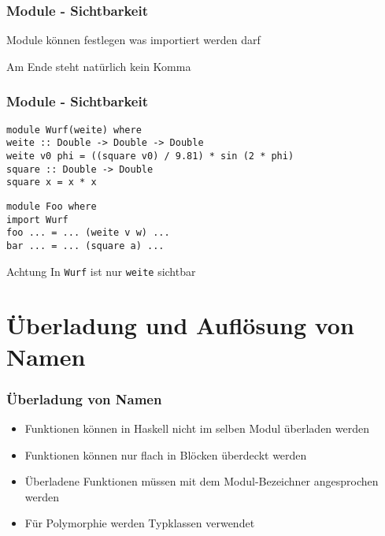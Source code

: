 \documentclass[fleqn,11pt,aspectratio=43]{beamer}
\begin{document}
\begin{frame}
\frametitle{Module - Sichtbarkeit}
\begin{block}{\vspace*{-3ex}}
Module können festlegen was importiert werden darf
\end{block}
\begin{block}{\vspace*{-3ex}}
\begin{center}
\scalebox{0.7}{}
\end{center}
Am Ende steht natürlich kein Komma
\end{block}
\end{frame}

\begin{frame}[fragile]
\frametitle{Module - Sichtbarkeit} 
\begin{lstlisting}
module Wurf(weite) where
weite :: Double -> Double -> Double
weite v0 phi = ((square v0) / 9.81) * sin (2 * phi)
square :: Double -> Double
square x = x * x
\end{lstlisting}
\begin{lstlisting}
module Foo where
import Wurf
foo ... = ... (weite v w) ...
bar ... = ... (square a) ...
\end{lstlisting}
\begin{alertblock}{Achtung}
In \lstinline|Wurf| ist nur \lstinline|weite| sichtbar
\end{alertblock}
\end{frame}

\section[Bezeichner]{Überladung und Auflösung von Namen~}
\begin{frame}
\frametitle{Überladung von Namen}
\begin{block}{\vspace*{-3ex}}
\begin{itemize}
  \item Funktionen können in Haskell nicht im selben Modul überladen werden
  \item Funktionen können nur flach in Blöcken überdeckt werden
  \item Überladene Funktionen müssen mit dem Modul-Bezeichner angesprochen werden
  \item Für Polymorphie werden Typklassen verwendet
\end{itemize}
\end{block}
\end{frame}
\end{document}
